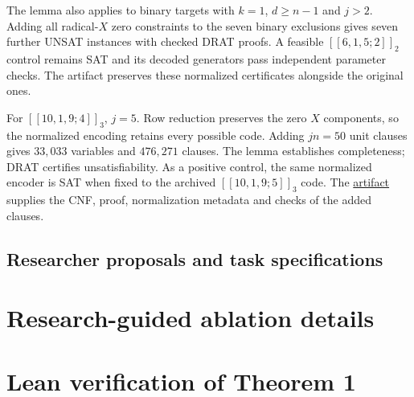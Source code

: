 \documentclass{article}
\newcommand{\artifactlink}{\href{https://github.com/LeGenAI/llm_guided_EAQECC_search/tree/arxiv-v1}{artifact}}
\begin{document}
The lemma also applies to binary targets with $k=1$, $d\ge n-1$
and $j>2$. Adding all radical-$X$ zero constraints to the seven
binary exclusions gives seven further UNSAT instances with checked
DRAT proofs. A feasible $[[6,1,5;2]]_2$ control remains SAT and its
decoded generators pass independent parameter checks. The artifact
preserves these normalized certificates alongside the original ones.

For $[[10,1,9;4]]_3$, $j=5$. Row reduction preserves the zero
$X$ components, so the normalized encoding retains every possible code.
Adding $jn=50$ unit clauses gives $33{,}033$ variables and $476{,}271$ clauses.
The lemma establishes completeness; DRAT certifies unsatisfiability.
As a positive control, the same normalized encoder is SAT when fixed to
the archived $[[10,1,9;5]]_3$ code. The \artifactlink{} supplies the CNF,
proof, normalization metadata and checks of the added clauses.



\begingroup
\raggedbottom
\subsection{Researcher proposals and task specifications}\label{app:prompts}

\endgroup

\section{Research-guided ablation details}\label{app:ablations}

\FloatBarrier

\clearpage
\section{Lean verification of Theorem 1}\label{app:lean}

\end{document}
